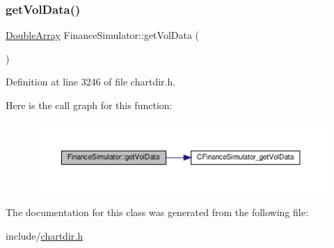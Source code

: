 \subsubsection{\texorpdfstring{get\+Vol\+Data()}{getVolData()}}
{\footnotesize\ttfamily \hyperlink{class_double_array}{Double\+Array} Finance\+Simulator\+::get\+Vol\+Data (\begin{DoxyParamCaption}{ }\end{DoxyParamCaption})\hspace{0.3cm}{\ttfamily [inline]}}



Definition at line 3246 of file chartdir.\+h.

Here is the call graph for this function\+:
\nopagebreak
\begin{figure}[H]
\begin{center}
\leavevmode
\includegraphics[width=350pt]{class_finance_simulator_ad0ff79eb418099f467eed27305d00b7a_cgraph}
\end{center}
\end{figure}


The documentation for this class was generated from the following file\+:\begin{DoxyCompactItemize}
\item 
include/\hyperlink{chartdir_8h}{chartdir.\+h}\end{DoxyCompactItemize}
